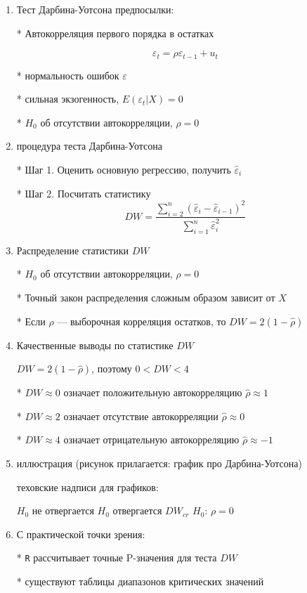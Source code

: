 \documentclass[12pt,a4paper]{article}
\begin{document}
{\begin{enumerate}
\newpage
\item Тест Дарбина-Уотсона предпосылки:

* Автокорреляция первого порядка в остатках

\[
\varepsilon_t=\rho \varepsilon_{t-1} + u_t
\]

* нормальность ошибок $\varepsilon$

* сильная экзогенность, $E(\varepsilon_t | X)=0$

* $H_0$ об отсутствии автокорреляции, $\rho=0$

\item процедура теста Дарбина-Уотсона

* Шаг 1. Оценить основную регрессию, получить $\hat{\varepsilon}_i$

* Шаг 2. Посчитать статистику 
$$DW=\frac{\sum_{i=2}^n(\hat{\varepsilon}_i-\hat{\varepsilon}_{i-1})^2}{\sum_{i=1}^n \hat{\varepsilon}_i^2}$$

\newpage
\item Распределение статистики $DW$

* $H_0$ об отсутствии автокорреляции, $\rho=0$

* Точный закон распределения сложным образом зависит от $X$

* Если $\hat{\rho}$ --- выборочная корреляция остатков, то $DW=2(1-\hat{\rho})$

\item Качественные выводы по статистике $DW$

$DW=2(1-\hat{\rho})$, поэтому $0<DW<4$

* $DW\approx 0$ означает положительную автокорреляцию $\hat{\rho}\approx 1$

* $DW\approx 2$ означает отсутствие автокорреляции $\hat{\rho}\approx 0$

* $DW\approx 4$ означает отрицательную автокорреляцию $\hat{\rho}\approx -1$

\item иллюстрация (рисунок прилагается: график про Дарбина-Уотсона)

теховские надписи для графиков:

$H_0$ не отвергается
$H_0$ отвергается
$DW_{cr}$
$H_0$: $\rho=0$

\newpage
\item С практической точки зрения: 

* \verb|R| рассчитывает точные P-значения для теста $DW$

* существуют таблицы  диапазонов критических значений




\end{enumerate}}
\end{document}
